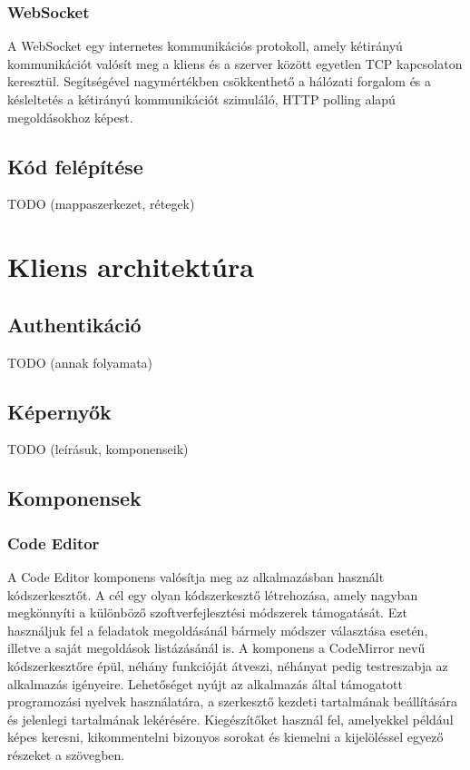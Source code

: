\documentclass{elteikthesis}
\begin{document}
				\subsubsection{WebSocket}
					A WebSocket \cite{websocket} egy internetes kommunikációs protokoll, amely kétirányú kommunikációt valósít meg a kliens és a szerver között egyetlen TCP kapcsolaton keresztül. Segítségével nagymértékben csökkenthető a hálózati forgalom és a késleltetés a kétirányú kommunikációt szimuláló, HTTP polling alapú megoldásokhoz képest.

			\subsection{Kód felépítése}
			TODO (mappaszerkezet, rétegek)
		
		\section{Kliens architektúra}

			\subsection{Authentikáció}
			TODO (annak folyamata)
			
			\subsection{Képernyők}
			TODO (leírásuk, komponenseik)
			
			\subsection{Komponensek}
				\subsubsection{Code Editor}
				A Code Editor komponens valósítja meg az alkalmazásban használt kódszerkesztőt. A cél egy olyan kódszerkesztő létrehozása, amely nagyban megkönnyíti a különböző szoftverfejlesztési módszerek támogatását. Ezt használjuk fel a feladatok megoldásánál bármely módszer választása esetén, illetve a saját megoldások listázásánál is. A komponens a CodeMirror nevű kódszerkesztőre épül, néhány funkcióját átveszi, néhányat pedig testreszabja az alkalmazás igényeire. Lehetőséget nyújt az alkalmazás által támogatott programozási nyelvek használatára, a szerkesztő kezdeti tartalmának beállítására és jelenlegi tartalmának lekérésére. Kiegészítőket használ fel, amelyekkel például képes keresni, kikommentelni bizonyos sorokat és kiemelni a kijelöléssel egyező részeket a szövegben.
				
\end{document}
